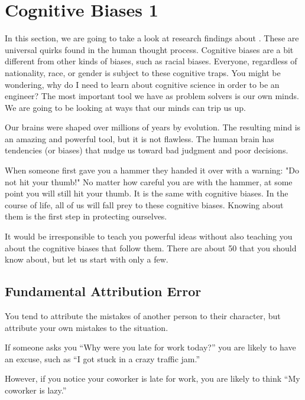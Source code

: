 \chapter{Cognitive Biases 1}

In this section, we are going to take a look at research findings about . These are universal quirks found in the human thought process. Cognitive biases are a bit different from other kinds of biases, such as racial biases. Everyone, regardless of nationality, race, or gender is subject to these cognitive traps. You might be wondering, why do I need to learn about cognitive science in order to be an engineer? The  most important tool we have as problem solvers is our own minds. We are going to be looking at ways that our minds can trip us up.

Our brains were shaped over millions of years by evolution. The resulting mind is an amazing and powerful tool, but it is
not flawless. The human brain has tendencies (or biases) that nudge us
toward bad judgment and poor decisions.

When someone first gave you a hammer they handed it over with a warning: "Do not hit your thumb!" No matter how careful you are with the hammer, at some point you will still hit your thumb. It is the same with cognitive biases. In the course of life, all of us will fall prey to these cognitive biases. Knowing about them is the first step in protecting ourselves. 

It would be irresponsible to teach you powerful ideas without
also teaching you about the cognitive biases that follow them. There are about 50 that you should know about, but let us start with only a few.

\section{Fundamental Attribution Error}



You tend to attribute
the mistakes of another person to their character, but attribute your
own mistakes to the situation.

If someone asks you ``Why were you late for work today?'' you
are likely to have an excuse, such as ``I got stuck in a crazy traffic jam.''

However, if you notice your coworker is late for work, you are likely to think ``My coworker is lazy.''


